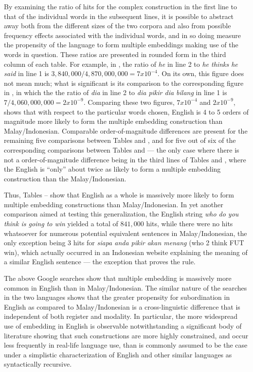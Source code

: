 \documentclass[output=paper,colorlinks,citecolor=brown
]{langscibook}
\begin{document}
By examining the ratio of hits for the complex construction in the first line to that of the individual words in the subsequent lines, it is possible to abstract away both from the different sizes of the two corpora and also from possible frequency effects associated with the individual words, and in so doing measure the propensity of the language to form multiple embeddings making use of the words in question.  These ratios are presented in rounded form in the third column of each table.  For example, in , the ratio of \textit{he} in line 2 to \textit{he thinks he said} in line 1 is $3,840,000 / 4,870,000,000 = 7 x 10^{-4}$.  On its own, this figure does not mean much; what is significant is its comparison to the corresponding figure in , in which the the ratio of \textit{dia} in line 2 to \textit{dia pikir dia bilang} in line 1 is $7 / 4,060,000,000 = 2 x 10^{-9}$.  Comparing these two figures, $7 x 10^{-4}$ and $2 x 10^{-9}$, shows that with respect to the particular words chosen, English is 4 to 5 orders of magnitude more likely to form the multiple embedding construction than Malay/Indonesian.  Comparable order-of-magnitude differences are present for the remaining five comparisons between Tables  and , and for five out of six of the corresponding comparisons between Tables  and  — the only case where there is not a order-of-magnitude difference being in the third lines of Tables  and , where the English is ``only'' about twice as likely to form a multiple embedding construction than the Malay/Indonesian.

Thus, Tables -- show that English as a whole is massively more likely to form multiple embedding constructions than Malay/Indonesian.  In yet another comparison aimed at testing this generalization, the English string \textit{who do you think is going to win} yielded a total of $841,000$ hits, while there were no hits whatsoever for numerous potential equivalent sentences in Malay/Indonesian, the only exception being 3 hits for \textit{siapa anda pikir akan menang} (who 2 think FUT win), which actually occurred in an Indonesian website explaining the meaning of a similar English sentence — the exception that proves the rule.

The above Google searches show that multiple embedding is massively more common in English than in Malay/Indonesian.  The similar nature of the searches in the two languages shows that the greater propensity for subordination in English as compared to Malay/Indonesian is  a cross-linguistic difference that is independent of both register and modality.  In particular, the more widespread use of embedding in English is observable notwithstanding a significant body of literature \citep{karlsson2007aconstraints,karlsson2007bconstraints,karlsson2009aorigin,karlsson2009bsyntactic} showing that such constructions are more highly constrained, and occur less frequently in real-life language use, than is commonly assumed to be the case under a simplistic characterization of English and other similar languages as syntactically recursive.
\end{document}
